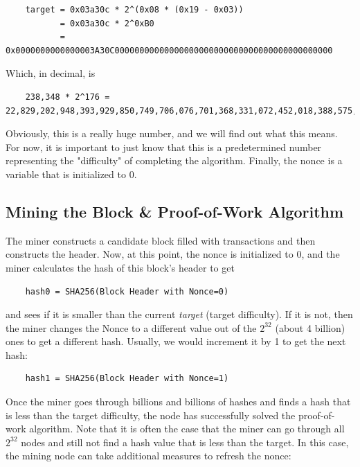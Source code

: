 \documentclass{article}
\begin{document}
    \begin{lstlisting}
    target = 0x03a30c * 2^(0x08 * (0x19 - 0x03))
           = 0x03a30c * 2^0xB0
           = 0x0000000000000003A30C00000000000000000000000000000000000000000000
    \end{lstlisting}

    Which, in decimal, is

    \begin{lstlisting}
    238,348 * 2^176 = 22,829,202,948,393,929,850,749,706,076,701,368,331,072,452,018,388,575,715,328
    \end{lstlisting}

    Obviously, this is a really huge number, and we will find out what this means. For now, it is important to just know that this is a predetermined number representing the "difficulty" of completing the algorithm. Finally, the nonce is a variable that is initialized to 0.

  \subsection{Mining the Block \& Proof-of-Work Algorithm}

    The miner constructs a candidate block filled with transactions and then constructs the header. Now, at this point, the nonce is initialized to 0, and the miner calculates the hash of this block's header to get

    \begin{lstlisting}
    hash0 = SHA256(Block Header with Nonce=0)
    \end{lstlisting}

    and sees if it is smaller than the current \textit{target} (target difficulty). If it is not, then the miner changes the Nonce to a different value out of the $2^{32}$ (about 4 billion) ones to get a different hash. Usually, we would increment it by 1 to get the next hash:

    \begin{lstlisting}
    hash1 = SHA256(Block Header with Nonce=1)
    \end{lstlisting}

    Once the miner goes through billions and billions of hashes and finds a hash that is less than the target difficulty, the node has successfully solved the proof-of-work algorithm. Note that it is often the case that the miner can go through all $2^{32}$ nodes and still not find a hash value that is less than the target. In this case, the mining node can take additional measures to refresh the nonce:
\end{document}
